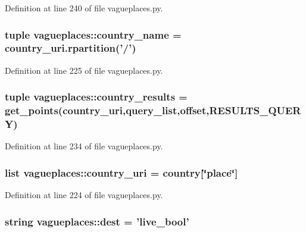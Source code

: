 \-Definition at line 240 of file vagueplaces.\-py.

\hypertarget{namespacevagueplaces_a439323fd94d6776127c4d46f50242309}{
\subsubsection[{country\-\_\-name}]{\setlength{\rightskip}{0pt plus 5cm}tuple {\bf vagueplaces\-::country\-\_\-name} = country\-\_\-uri.\-rpartition('/')}}\label{namespacevagueplaces_a439323fd94d6776127c4d46f50242309}


\-Definition at line 225 of file vagueplaces.\-py.

\hypertarget{namespacevagueplaces_a05416e0b132e478c479ed1fba77ad4a8}{
\subsubsection[{country\-\_\-results}]{\setlength{\rightskip}{0pt plus 5cm}tuple {\bf vagueplaces\-::country\-\_\-results} = {\bf get\-\_\-points}({\bf country\-\_\-uri},{\bf query\-\_\-list},{\bf offset},{\bf \-R\-E\-S\-U\-L\-T\-S\-\_\-\-Q\-U\-E\-R\-Y})}}\label{namespacevagueplaces_a05416e0b132e478c479ed1fba77ad4a8}


\-Definition at line 234 of file vagueplaces.\-py.

\hypertarget{namespacevagueplaces_aed19f140324bfa70b0d22d5078ed1a33}{
\subsubsection[{country\-\_\-uri}]{\setlength{\rightskip}{0pt plus 5cm}list {\bf vagueplaces\-::country\-\_\-uri} = {\bf country}\mbox{[}\char`\"{}place\char`\"{}\mbox{]}}}\label{namespacevagueplaces_aed19f140324bfa70b0d22d5078ed1a33}


\-Definition at line 224 of file vagueplaces.\-py.

\hypertarget{namespacevagueplaces_aacfed2e477d0a97080d7d50fb875619e}{
\subsubsection[{dest}]{\setlength{\rightskip}{0pt plus 5cm}string {\bf vagueplaces\-::dest} = 'live\-\_\-bool'}}\label{namespacevagueplaces_aacfed2e477d0a97080d7d50fb875619e}


